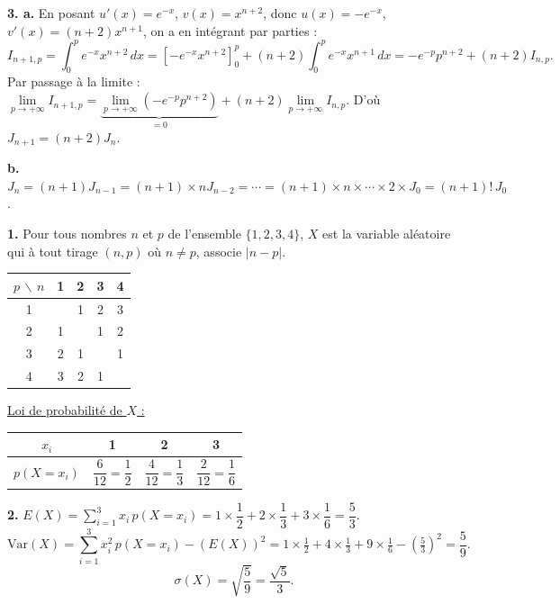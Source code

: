 \documentclass[11pt]{article}
\begin{document}
\textbf{3. a.} En posant $u'(x) = e^{-x}$, $v(x) = x^{n+2}$, donc $u(x) = -e^{-x}$, $v'(x) = (n+2)x^{n+1}$, on a en intégrant par parties :
\[ I_{n+1,p} = \int_0^p e^{-x}x^{n+2}\,dx = \left[-e^{-x}x^{n+2}\right]_0^p + (n+2)\int_0^p e^{-x}x^{n+1}\,dx = -e^{-p}p^{n+2} + (n+2)I_{n,p}. \]
Par passage à la limite : $\lim\limits_{p\to+\infty} I_{n+1,p} = \underbrace{\lim\limits_{p\to+\infty}(-e^{-p}p^{n+2})}_{=0} + (n+2)\lim\limits_{p\to+\infty} I_{n,p}$. D'où $J_{n+1} = (n+2)J_n$.

\textbf{b.} $J_n = (n+1)J_{n-1} = (n+1) \times n J_{n-2} = \cdots = (n+1) \times n \times \cdots \times 2 \times J_0 = (n+1)!\,J_0$.


\textbf{1.} Pour tous nombres $n$ et $p$ de l'ensemble $\{1, 2, 3, 4\}$, $X$ est la variable aléatoire qui à tout tirage $(n, p)$ où $n \ne p$, associe $|n - p|$.
\begin{center}\renewcommand{\arraystretch}{1.3}
\begin{tabular}{|c|c|c|c|c|}
\hline
$p\,\backslash\,n$ & 1 & 2 & 3 & 4 \\
\hline
1 & & 1 & 2 & 3 \\
\hline
2 & 1 & & 1 & 2 \\
\hline
3 & 2 & 1 & & 1 \\
\hline
4 & 3 & 2 & 1 & \\
\hline
\end{tabular}
\end{center}

\underline{Loi de probabilité de $X$ :}
\begin{center}\renewcommand{\arraystretch}{1.6}
\begin{tabular}{|c|c|c|c|}
\hline
$x_i$ & 1 & 2 & 3 \\
\hline
$p(X = x_i)$ & $\dfrac{6}{12} = \dfrac{1}{2}$ & $\dfrac{4}{12} = \dfrac{1}{3}$ & $\dfrac{2}{12} = \dfrac{1}{6}$ \\
\hline
\end{tabular}
\end{center}

\textbf{2.} $E(X) = \sum_{i=1}^3 x_i\,p(X = x_i) = 1 \times \dfrac{1}{2} + 2 \times \dfrac{1}{3} + 3 \times \dfrac{1}{6} = \dfrac{5}{3}$.
\[ \mathrm{Var}(X) = \sum_{i=1}^3 x_i^2\,p(X = x_i) - (E(X))^2 = 1 \times \tfrac{1}{2} + 4 \times \tfrac{1}{3} + 9 \times \tfrac{1}{6} - \left(\tfrac{5}{3}\right)^2 = \frac{5}{9}. \]
\[ \sigma(X) = \sqrt{\frac{5}{9}} = \frac{\sqrt{5}}{3}. \]
\end{document}

